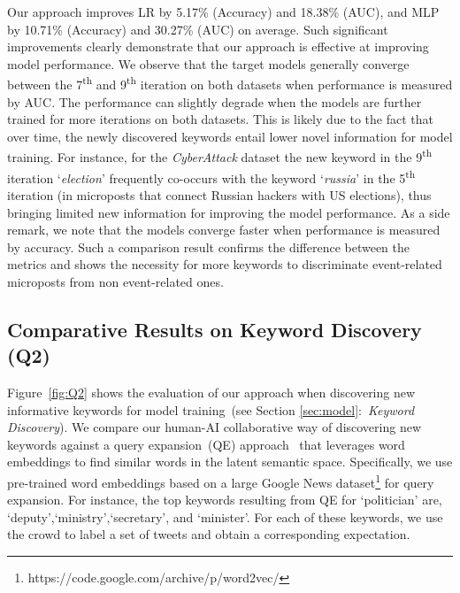 \documentclass[letterpaper]{article}
\begin{document}
Our approach improves LR by 5.17\% (Accuracy) and 18.38\% (AUC), and MLP by 10.71\% (Accuracy) and 30.27\% (AUC) on average. Such significant improvements clearly demonstrate that our approach is effective at improving model performance. We observe that the target models generally converge between the 7\textsuperscript{th} and 9\textsuperscript{th} iteration on both datasets when performance is measured by AUC.
The performance can slightly degrade when the models are further trained for more iterations on both datasets. This is likely due to the fact that over time, the newly discovered keywords entail lower novel information for model training. For instance, for the \emph{CyberAttack} dataset the new keyword in the 9\textsuperscript{th} iteration \lq \textit{election}' frequently co-occurs with the keyword \lq \textit{russia}' in the 5\textsuperscript{th} iteration (in microposts that connect Russian hackers with US elections), thus bringing limited new information for improving the model performance. As a side remark, we note that the models converge faster when performance is measured by accuracy. Such a comparison result confirms the difference between the metrics and shows the necessity for more keywords to discriminate event-related microposts from non event-related ones.

\subsection{Comparative Results on Keyword Discovery (Q2)}

Figure~\ref{fig:Q2} shows the evaluation of our approach when discovering new informative keywords for model training~(see Section \ref{sec:model}:~\emph{Keyword Discovery}). We compare our human-AI collaborative way of discovering new keywords against a query expansion~(QE) approach~\cite{diaz2016query,kuzi2016query} that leverages word embeddings to find similar words in the latent semantic space. Specifically, we use pre-trained word embeddings based on a large Google News dataset\footnote{https://code.google.com/archive/p/word2vec/} for query expansion. For instance, the top keywords resulting from QE for \lq politician' are, \lq deputy',\lq ministry',\lq secretary', and \lq minister'. For each of these keywords, we use the crowd to label a set of tweets and obtain a corresponding expectation.
\end{document}
